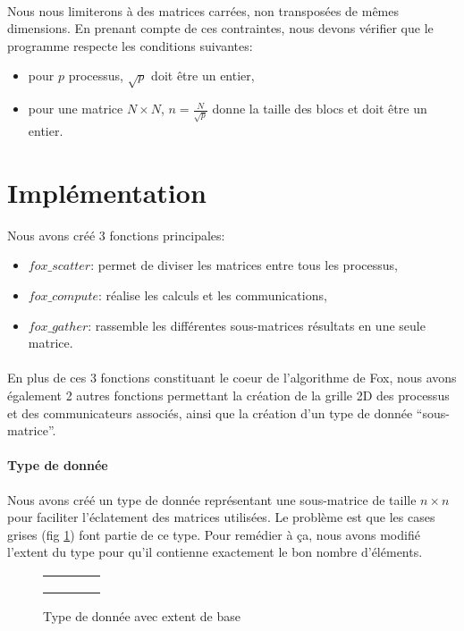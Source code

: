 \documentclass[12pt]{article}
\begin{document}
\paragraph{}Nous nous limiterons à des matrices carrées, non transposées de mêmes dimensions. En prenant compte de ces contraintes, nous devons vérifier que le programme respecte les conditions suivantes:
\begin{itemize}
\item pour $p$ processus, $\sqrt{p}$ doit être un entier,
\item pour une matrice $N \times N$, $n= \frac{N}{\sqrt{p}} $ donne la taille des blocs et doit être un entier.
\end{itemize}

\section{Implémentation} \label{s:impl}
Nous avons créé 3 fonctions principales:
\begin{itemize}
\item $fox\_scatter$: permet de diviser les matrices entre tous les processus,
\item $fox\_compute$: réalise les calculs et les communications,
\item $fox\_gather$: rassemble les différentes sous-matrices résultats en une seule matrice.
\end{itemize}

\paragraph{}
En plus de ces 3 fonctions constituant le coeur de l'algorithme de Fox, nous avons également 2 autres fonctions permettant la création de la grille 2D des processus et des communicateurs associés, ainsi que la création d'un type de donnée ``sous-matrice''.

\paragraph{Type de donnée}
Nous avons créé un type de donnée représentant une sous-matrice de taille $n\times n$ pour faciliter l'éclatement des matrices utilisées. Le problème est que les cases grises (fig \ref{fig:datatype}) font partie de ce type. Pour remédier à ça, nous avons modifié l'extent du type pour qu'il contienne exactement le bon nombre d'éléments. 


\begin{figure}[ht]
  \centering
  \begin{tabular}{|c|c||c|c|}
    \hline
    \cellcolor{green}& \cellcolor{green} & & \\ 
    \hline
    \cellcolor{green}& \cellcolor{green}& & \\ 
    \hline
    \hline
    \cellcolor{gray}& & & \\ 
    \hline
    \cellcolor{gray}& & & \\ 
    \hline
  \end{tabular}
  \caption{\label{fig:datatype} Type de donnée avec extent de base}
\end{figure}
\end{document}
